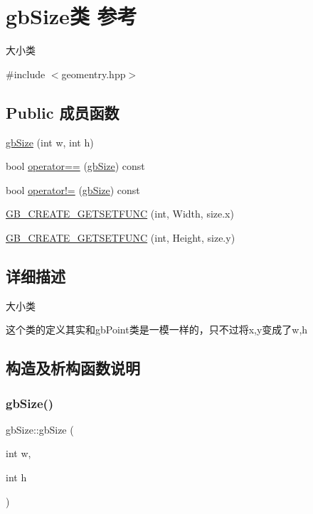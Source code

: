 \hypertarget{classgb_size}{}\section{gb\+Size类 参考}
\label{classgb_size}


大小类  




{\ttfamily \#include $<$geomentry.\+hpp$>$}

\subsection*{Public 成员函数}
\begin{DoxyCompactItemize}
\item 
\mbox{\hyperlink{classgb_size_add567a0e5d087f3e02aa946f85324eab}{gb\+Size}} (int w, int h)
\item 
bool \mbox{\hyperlink{classgb_size_abd08171a7d3cbc6b31a101a40d480a9b}{operator==}} (\mbox{\hyperlink{classgb_size}{gb\+Size}}) const
\item 
bool \mbox{\hyperlink{classgb_size_a2244c845aebe7337f422a5684a3f06f6}{operator!=}} (\mbox{\hyperlink{classgb_size}{gb\+Size}}) const
\item 
\mbox{\hyperlink{classgb_size_a4f800a6e37ba8b5b93ab1c9b5f905bd0}{G\+B\+\_\+\+C\+R\+E\+A\+T\+E\+\_\+\+G\+E\+T\+S\+E\+T\+F\+U\+NC}} (int, Width, size.\+x)
\item 
\mbox{\hyperlink{classgb_size_af52b9c5cd6fceccaca9b80a86f90a380}{G\+B\+\_\+\+C\+R\+E\+A\+T\+E\+\_\+\+G\+E\+T\+S\+E\+T\+F\+U\+NC}} (int, Height, size.\+y)
\end{DoxyCompactItemize}


\subsection{详细描述}
大小类 

这个类的定义其实和gb\+Point类是一模一样的，只不过将x,y变成了w,h 

\subsection{构造及析构函数说明}
\mbox{\label{classgb_size_add567a0e5d087f3e02aa946f85324eab}} 
\subsubsection{\texorpdfstring{gbSize()}{gbSize()}}
{\footnotesize\ttfamily gb\+Size\+::gb\+Size (\begin{DoxyParamCaption}\item[{int}]{w,  }\item[{int}]{h }\end{DoxyParamCaption})}



